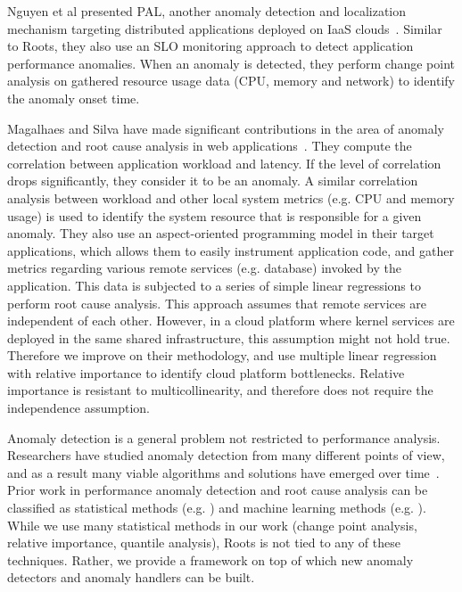 Nguyen et al presented PAL, another anomaly detection and localization mechanism targeting
distributed applications deployed on IaaS clouds~\cite{Nguyen:2011:PPR:2038633.2038634}. 
Similar to Roots, they also use an SLO monitoring approach to detect application
performance anomalies. When an anomaly is detected, they perform change point analysis
on gathered resource usage data (CPU, memory and network) to identify the anomaly onset time.

Magalhaes and Silva have made significant contributions in the area of anomaly detection
and root cause analysis in web applications~\cite{Magalhaes:2010:DPA:1906485.1906774, Magalhaes:2011:RAP:1982185.1982234}. 
They compute the correlation between application
workload and latency. If the level of correlation drops significantly, they consider it to be an
anomaly. A similar correlation analysis between workload and other local system metrics 
(e.g. CPU and memory usage) is used to identify the system resource that is responsible for
a given anomaly.
They also use an aspect-oriented programming model in their target applications, which
allows them to easily instrument application code, and gather metrics regarding various 
remote services (e.g. database) invoked by the application. This data is subjected to a 
series of simple linear regressions to perform root cause analysis. This approach assumes
that remote services are independent of each other. However, in a cloud platform where
kernel services are deployed in the same shared infrastructure, this assumption might not
hold true. Therefore we improve on their methodology, and use multiple linear regression
with relative importance to identify cloud platform bottlenecks. Relative importance
is resistant to multicollinearity, and therefore does not require the independence assumption.

Anomaly detection is a general problem not restricted to performance analysis. Researchers
have studied anomaly detection from many different points of view, and as a result many
viable algorithms and solutions have emerged over time~\cite{Chandola:2009:ADS:1541880.1541882}.
Prior work in performance anomaly detection and root cause analysis can be classified as statistical
methods (e.g. \cite{6311395,Malkowski:2007:BDU:1783374.1783389,Magalhaes:2011:RAP:1982185.1982234,Nguyen:2011:PPR:2038633.2038634}) 
and machine learning methods (e.g. \cite{Cohen:2004:CID:1251254.1251270,Yu:2013:SNA:2494621.2494643,bhaduri2011detecting}).
While we use many statistical methods
in our work (change point analysis, relative importance, quantile analysis), Roots is not tied to any of these
techniques. Rather, we provide a framework on top of which new anomaly detectors and anomaly
handlers can be built. 
